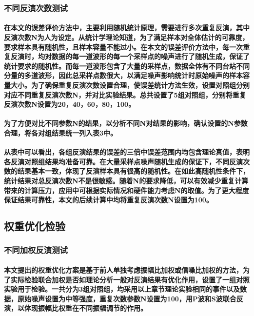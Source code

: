 \documentclass[a4paper,12pt,single,pdftex]{scrartcl}
\begin{document}
\label{ID_74589139}\subsubsection{不同反演次数测试}

\label{ID_1184261481}\paragraph{在本文的误差评价方法中，主要利用随机统计原理，需要进行多次重复反演，其中反演次数N为人为设定。从统计学理论知道，为了满足样本对全体估计的可靠度，要求样本具有随机性，且样本容量不能过小。在本文的误差评价方法中，每一次重复反演时，均对数据的每一道波形的每一个采样点的噪声进行了随机生成，保证了统计要求的随机性。而每一道波形包含了大量的采样点，数据全体有不同台站不同分量的多道波形，因此总采样点数很大，以满足噪声影响统计时原始噪声的样本容量大小。为了确保重复反演次数设置合理，使误差统计方法生效，设置对照组分别对应不同重复反演次数N，并对比实验结果。总共设置了5组对照组，分别将重复反演次数N设置为20，40，60，80，100。}

\label{ID_833255484}\paragraph{为了方便对比不同参数N的结果，以分析不同N对结果的影响，确认设置的N参数合理，将各对组结果统一列入表3中。}

\label{ID_1985324973}\paragraph{从表中可以看出，各组反演结果的误差的三倍中误差范围内均包含理论真值，表明各反演对照组结果均准备可靠。在大量采样点噪声随机生成的保证下，不同反演次数的结果基本一致，体现了反演样本具有很高的随机性。在如此高随机性条件下，统计结果对总反演次数N不是很敏感。随着N的要求降低，可以有效减少重复计算带来的计算压力，应用中可根据实际情况和硬件能力考虑N的取值。为了更大程度保证结果可靠性，本文的后续计算中均将重复反演次数N设置为100。}

\label{ID_849140981}\subsection{权重优化检验}

\label{ID_979847281}\subsubsection{不同加权反演测试}

\label{ID_563979352}\paragraph{本文提出的权重优化方案是基于前人单独考虑振幅比加权或信噪比加权的方法，为了实际检验联合加权是否如理论分析一般对反演结果有优化作用，设置了一组对照实验用于检验。一共分为3组对照组，均采用以上章节理论实验相同的事件以及数据，原始噪声设置为中等强度，重复次数参数N设置为100，用P波和S波联合反演，以体现振幅比权重在不同振幅调节的作用。}
\end{document}
